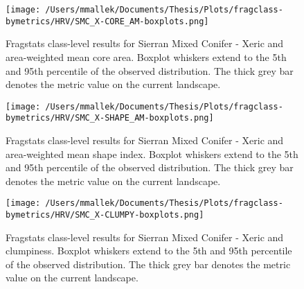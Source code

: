 \begin{figure}[!htbp]
\centering
    \texttt{[image: /Users/mmallek/Documents/Thesis/Plots/fragclass-bymetrics/HRV/SMC\_X-CORE\_AM-boxplots.png]}
  \caption{Fragstats class-level results for Sierran Mixed Conifer - Xeric and area-weighted mean core area. Boxplot whiskers extend to the 5th and 95th percentile of the observed distribution. The thick grey bar denotes the metric value on the current landscape.}
  \label{fig:smcx_coream}
\end{figure}


\begin{figure}[!htbp]
\centering
    \texttt{[image: /Users/mmallek/Documents/Thesis/Plots/fragclass-bymetrics/HRV/SMC\_X-SHAPE\_AM-boxplots.png]}
  \caption{Fragstats class-level results for Sierran Mixed Conifer - Xeric and area-weighted mean shape index. Boxplot whiskers extend to the 5th and 95th percentile of the observed distribution. The thick grey bar denotes the metric value on the current landscape.}
  \label{fig:smcx_shapeam}
\end{figure}


\begin{figure}[!htbp]
\centering
    \texttt{[image: /Users/mmallek/Documents/Thesis/Plots/fragclass-bymetrics/HRV/SMC\_X-CLUMPY-boxplots.png]}
  \caption{Fragstats class-level results for Sierran Mixed Conifer - Xeric and clumpiness. Boxplot whiskers extend to the 5th and 95th percentile of the observed distribution. The thick grey bar denotes the metric value on the current landscape.}
  \label{fig:smcx_clumpy}
\end{figure}
